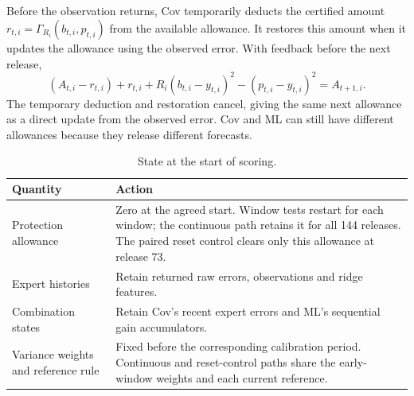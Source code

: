 
\subsection{}\label{sec:statepaths}

Before the observation returns, Cov temporarily deducts the certified
amount $r_{t,i}=\Gamma_{R_i}(b_{t,i},p_{t,i})$ from the available allowance.
It restores this amount when it updates the allowance using the observed
error. With feedback before the next release,
\begin{equation}
(A_{t,i}-r_{t,i})+r_{t,i}+R_i(b_{t,i}-y_{t,i})^2-(p_{t,i}-y_{t,i})^2
=A_{t+1,i}.
\label{eq:reservation}
\end{equation}
The temporary deduction and restoration cancel, giving the same next
allowance as a direct update from the observed error. Cov and ML can
still have different allowances because they release different forecasts.

\begin{table}[htbp]\centering\small
\caption{State at the start of scoring.}\label{tab:reset}
\begin{tabular}{@{}p{.31\linewidth}p{.64\linewidth}@{}}\toprule
Quantity & Action\\\midrule
Protection allowance & Zero at the agreed start. Window tests restart for each window; the continuous path retains it for all 144 releases. The paired reset control clears only this allowance at release 73.\\
Expert histories & Retain returned raw errors, observations and ridge features.\\
Combination states & Retain Cov's recent expert errors and ML's sequential gain accumulators.\\
Variance weights and reference rule & Fixed before the corresponding calibration period. Continuous and reset-control paths share the early-window weights and each current reference.\\\bottomrule
\end{tabular}\end{table}

